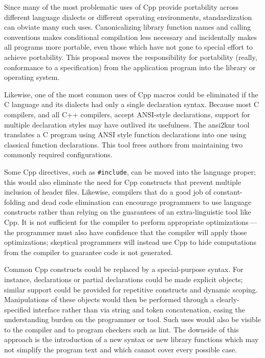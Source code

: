 \documentclass[10pt]{article}
\begin{document}
Since many of the most problematic uses of Cpp provide portability across
different language dialects or different operating environments,
standardization can obviate many such uses.  Canonicalizing library
function names and calling conventions makes conditional compilation less
necessary and incidentally makes all programs more portable, even those
which have not gone to special effort to achieve portability.  This
proposal moves the responsibility for portability (really, conformance to a
specification) from the application program into the library or operating
system.  

Likewise, one of the most common uses of Cpp macros could be eliminated if
the C language and its dialects had only a single declaration syntax.
Because most C compilers, and all C++ compilers, accept ANSI-style
declarations, support for multiple declaration styles may have outlived its
usefulness.  The ansi2knr tool~\cite{Deutsch90} translates a C program
using ANSI style function declarations into one using classical function
declarations.  This tool frees authors from maintaining two commonly
required configurations.

Some Cpp directives, such as {\tt \#include}, can be moved into the
language proper; this would also eliminate the need for Cpp constructs
that prevent multiple inclusion of header files.  Likewise, compilers
that do a good job of constant-folding and dead code elimination can
encourage programmers to use language constructs rather than relying on
the guarantees of an extra-linguistic tool like Cpp.  It is not
sufficient for the compiler to perform appropriate
optimizations\,---\,the programmer must also have confidence that the
compiler will apply those optimizations; skeptical programmers will
instead use Cpp to hide computations from the compiler to 
guarantee code is not generated.

Common Cpp constructs could be replaced by a special-purpose syntax.  For
instance, declarations or partial declarations could be made explicit
objects; similar support could be provided for repetitive constructs and
dynamic scoping.  Manipulations of these objects would then be performed
through a clearly-specified interface rather than via string and token
concatenation, easing the understanding burden on the programmer or tool.
Such uses would also be visible to the compiler and to program checkers
such as lint.  The downside of this approach is the introduction of a new
syntax or new library functions which may not simplify the program text and
which cannot cover every possible case.
\end{document}
